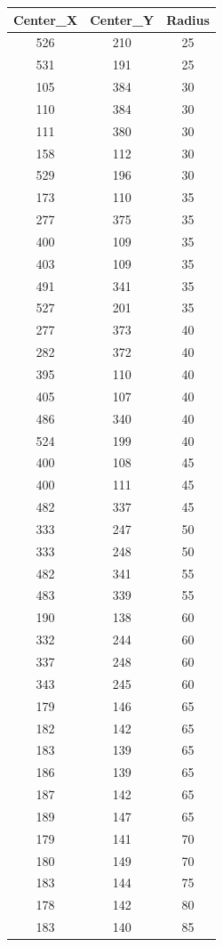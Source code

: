 \documentclass[12pt]{article}
\begin{document}
\begin{tabular}{|c|c|c|}
	\hline
	Center\_X & Center\_Y & Radius \\
\hline
526& 210& 25 \\
\hline
531& 191& 25 \\
\hline
105& 384& 30 \\
\hline
110& 384&30 \\
\hline
111& 380& 30 \\
\hline
158& 112& 30 \\
\hline
529& 196& 30 \\
\hline
173& 110& 35 \\
\hline
277& 375& 35 \\
\hline
400& 109& 35 \\
\hline
403& 109& 35 \\
\hline
491& 341& 35 \\
\hline
527& 201& 35 \\

277&373& 40 \\
\hline
282& 372& 40 \\
\hline
395& 110& 40 \\
\hline
405& 107& 40 \\
\hline
486& 340& 40 \\
\hline
524& 199& 40 \\
\hline
400& 108& 45 \\
\hline
400& 111& 45 \\
\hline
482& 337& 45 \\
\hline
333& 247& 50 \\
\hline
333& 248& 50 \\
\hline
482& 341& 55 \\
\hline
483& 339& 55 \\
\hline
190& 138& 60 \\
\hline
332& 244& 60 \\
\hline
337& 248& 60 \\
\hline
343& 245& 60 \\
\hline
179& 146& 65 \\
\hline
182& 142& 65 \\
\hline
183& 139& 65 \\
\hline
186& 139& 65 \\
\hline
187&142& 65 \\
\hline
189& 147& 65 \\
\hline
179& 141& 70 \\
\hline
180& 149& 70 \\
\hline
183& 144& 75 \\
\hline
178& 142& 80 \\
\hline
183& 140& 85 \\
\hline


\end{tabular}
\end{document}
